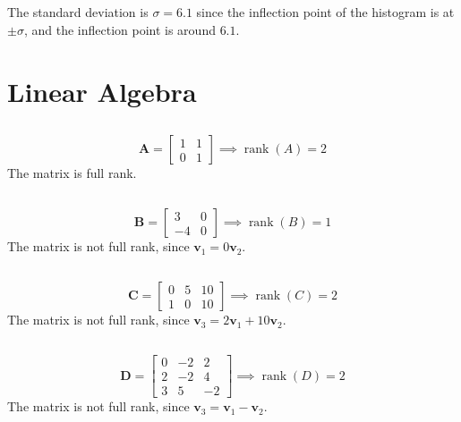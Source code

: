 \documentclass{article}
\DeclareMathOperator{\rank}{rank}
\begin{document}
\subsection{}

The standard deviation is \(\sigma = 6.1\) since the inflection point of the histogram is at \(\pm \sigma\), and the inflection point is around \(6.1\).

\section{Linear Algebra}

\subsection{}

\begin{equation}
    \bm{A} =
    \begin{bmatrix}
        1 & 1 \\
        0 & 1
    \end{bmatrix} \implies \rank(A) = 2
\end{equation}
The matrix is full rank.

\subsection{}

\begin{equation}
    \bm{B} =
    \begin{bmatrix}
        3 & 0 \\
        -4 & 0
    \end{bmatrix} \implies \rank(B) = 1
\end{equation}
The matrix is not full rank, since \(\bm{v}_1 = 0\bm{v}_2\).

\subsection{}

\begin{equation}
    \bm{C} =
    \begin{bmatrix}
        0 & 5 & 10 \\
        1 & 0 & 10
    \end{bmatrix} \implies \rank(C) = 2
\end{equation}
The matrix is not full rank, since \(\bm{v}_3 = 2\bm{v}_1 + 10\bm{v}_2\).

\subsection{}

\begin{equation}
    \bm{D} =
    \begin{bmatrix}
        0 & -2 & 2 \\
        2 & -2 & 4 \\
        3 & 5 & -2
    \end{bmatrix} \implies \rank(D) = 2
\end{equation}
The matrix is not full rank, since \(\bm{v}_3 = \bm{v}_1 - \bm{v}_2\).
\end{document}
